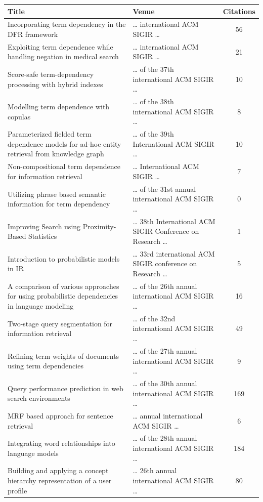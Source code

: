\documentclass[letterpaper,12pt]{article}
\begin{document}
\begin{longtable}{|p{9cm}|p{5cm}|c|}

\hline
Title & Venue & Citations\\
\hline\hline
Incorporating term dependency in the DFR framework & … international ACM SIGIR … & 56  \\ \hline
Exploiting term dependence while handling negation in medical search & … international ACM SIGIR … & 21  \\ \hline
Score-safe term-dependency processing with hybrid indexes & … of the 37th international ACM SIGIR … & 10  \\ \hline
Modelling term dependence with copulas & … of the 38th international ACM SIGIR … & 8  \\ \hline
Parameterized fielded term dependence models for ad-hoc entity retrieval from knowledge graph & … of the 39th International ACM SIGIR … & 10  \\ \hline
Non-compositional term dependence for information retrieval & … International ACM SIGIR … & 7  \\ \hline
Utilizing phrase based semantic information for term dependency & … of the 31st annual international ACM SIGIR … & 0  \\ \hline
Improving Search using Proximity-Based Statistics & … 38th International ACM SIGIR Conference on Research … & 1  \\ \hline
Introduction to probabilistic models in IR & … 33rd international ACM SIGIR conference on Research … & 5  \\ \hline
A comparison of various approaches for using probabilistic dependencies in language modeling & … of the 26th annual international ACM SIGIR … & 16  \\ \hline
Two-stage query segmentation for information retrieval & … of the 32nd international ACM SIGIR … & 49  \\ \hline
Refining term weights of documents using term dependencies & … of the 27th annual international ACM SIGIR … & 9  \\ \hline
Query performance prediction in web search environments & … of the 30th annual international ACM SIGIR … & 169  \\ \hline
MRF based approach for sentence retrieval & … annual international ACM SIGIR … & 6  \\ \hline
Integrating word relationships into language models & … of the 28th annual international ACM SIGIR … & 184  \\ \hline
Building and applying a concept hierarchy representation of a user profile & … 26th annual international ACM SIGIR … & 80  \\ \hline

\end{longtable}
\end{document}
